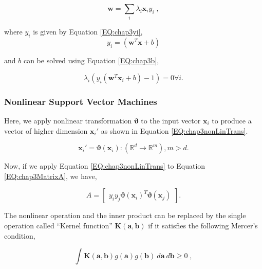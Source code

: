     \begin{equation}
    	\mathbf{w} = \sum_i \lambda_i \mathbf{x}_i y_i\; ,
    	\label{EQ:chap3OptimalProj}
    \end{equation}
    
    \noindent where $y_i$ is given by Equation \ref{EQ:chap3yi},
    \begin{equation}
    	y_i = (\mathbf{w}^T \mathbf{x} + b)
    	\label{EQ:chap3yi}
    \end{equation}
    
    \noindent and $b$ can be solved using Equation \ref{EQ:chap3b},
    
    \begin{equation}
    	\lambda_i(y_i(\mathbf{w}^T \mathbf{x}_i +b) - 1) = 0 \forall i.
    	\label{EQ:chap3b}
    \end{equation}
    
    \subsubsection{Nonlinear Support Vector Machines}
        \label{Nonlinear SVM}
    	Here, we apply nonlinear transformation $\bm{\vartheta}$ to the input vector $\mathbf{x}_i$ to produce a vector of higher dimension $\mathbf{x}_{i}'$ as shown in Equation \ref{EQ:chap3nonLinTrans}.
    
    \begin{equation}
    	\mathbf{x}_{i}' = \bm{\vartheta}(\mathbf{x}_i) : (\mathbb{R}^d \rightarrow \mathbb{R}^m), m > d.
    	\label{EQ:chap3nonLinTrans}
    \end{equation}
    
    Now, if we apply Equation \ref{EQ:chap3nonLinTrans} to Equation \ref{EQ:chap3MatrixA}, we have,
    
    \begin{equation}
		A = 
    	\begin{bmatrix}
	    	y_i y_j \bm{\vartheta}(\mathbf{x}_i)^T \bm{\vartheta}(\mathbf{x}_j)
    	\end{bmatrix}.
    	\label{EQ:chap3Amod}
    \end{equation}
    
    The nonlinear operation and the inner product can be replaced by the single operation called ``Kernel function'' $\mathbf{K(a,b)}$ if it satisfies the following Mercer's condition,
    
	\begin{equation}
		\int \mathbf{K(a,b)} g(\mathbf{a}) g(\mathbf{b}) \  d\bm{a} \  d\bm{b} \geq 0 \;,
        \label{EQ:chap3mercerscondition}
	\end{equation}

